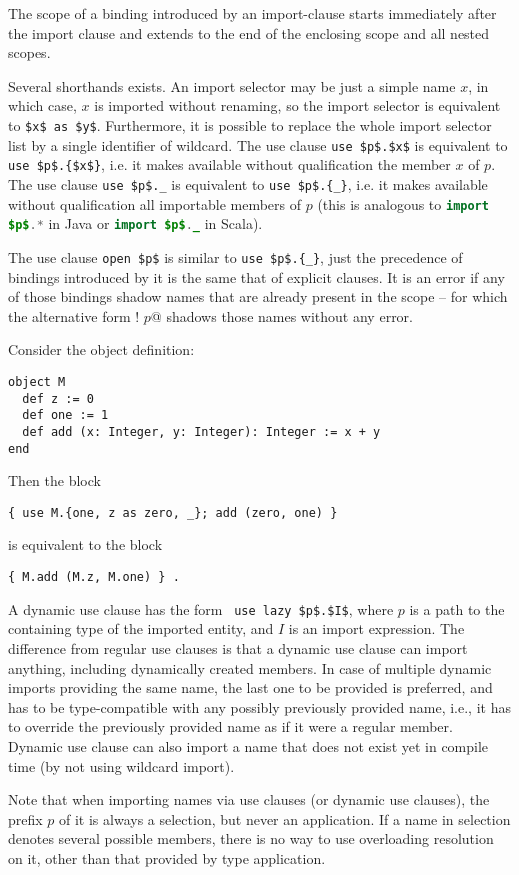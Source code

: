 The scope of a binding introduced by an import-clause starts immediately after the import clause and extends to the end of the enclosing scope and all nested scopes. 

Several shorthands exists. An import selector may be just a simple name $x$, in which case, $x$ is imported without renaming, so the import selector is equivalent to \lstinline!$x$ as $y$!. Furthermore, it is possible to replace the whole import selector list by a single identifier of wildcard. The use clause \lstinline!use $p$.$x$! is equivalent to \lstinline!use $p$.{$x$}!, i.e. it makes available without qualification the member $x$ of $p$. The use clause \lstinline!use $p$._! is equivalent to \lstinline!use $p$.{_}!, i.e. it makes available without qualification all importable members of $p$ (this is analogous to \lstinline[language=Java]!import $p$.*! in Java or \lstinline[language=Java]!import $p$._! in Scala). 

The use clause \lstinline!open $p$! is similar to \lstinline!use $p$.{_}!, just the precedence of bindings introduced by it is the same that of explicit  clauses. It is an error if any of those bindings shadow names that are already present in the scope -- for which the alternative form \lstinline@open! $p$@ shadows those names without any error. 

\example Consider the object definition:
\begin{lstlisting}
object M
  def z := 0
  def one := 1
  def add (x: Integer, y: Integer): Integer := x + y
end
\end{lstlisting}
Then the block
\begin{lstlisting}
{ use M.{one, z as zero, _}; add (zero, one) }
\end{lstlisting}
is equivalent to the block
\begin{lstlisting}
{ M.add (M.z, M.one) } .
\end{lstlisting}

A dynamic use clause has the form ~\lstinline!use lazy $p$.$I$!, where $p$ is a path to the containing type of the imported entity, and $I$ is an import expression. The difference from regular use clauses is that a dynamic use clause can import anything, including dynamically created members. In case of multiple dynamic imports providing the same name, the last one to be provided is preferred, and has to be type-compatible with any possibly previously provided name, i.e., it has to override the previously provided name as if it were a regular member. Dynamic use clause can also import a name that does not exist yet in compile time (by not using wildcard import). 

Note that when importing names via use clauses (or dynamic use clauses), the prefix $p$ of it is always a selection, but never an application. If a name in selection denotes several possible members, there is no way to use overloading resolution on it, other than that provided by type application. 





